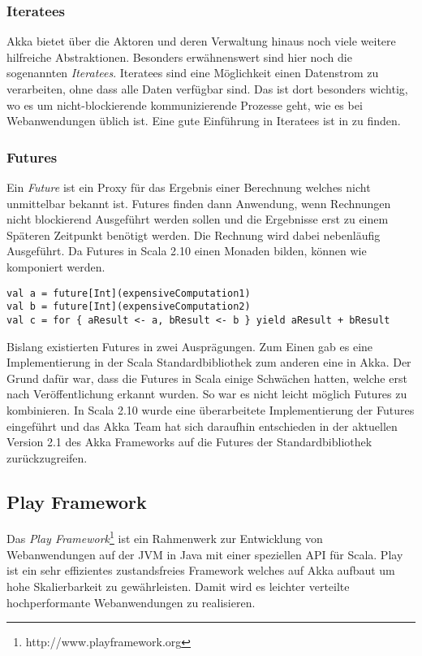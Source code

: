 \subsubsection{Iteratees}
\label{sec:iteratees}

Akka bietet über die Aktoren und deren Verwaltung hinaus noch viele weitere hilfreiche
Abstraktionen. Besonders erwähnenswert sind hier noch die sogenannten \textit{Iteratees}. Iteratees
sind eine Möglichkeit einen Datenstrom zu verarbeiten, ohne dass alle Daten verfügbar sind. Das ist
dort besonders wichtig, wo es um nicht-blockierende kommunizierende Prozesse geht, wie es bei
Webanwendungen üblich ist. Eine gute Einführung in Iteratees ist in \cite{iteratees} zu finden.

\subsubsection{Futures}
\label{sec:futures}

Ein \textit{Future} ist ein Proxy für das Ergebnis einer Berechnung welches nicht unmittelbar
bekannt ist. Futures finden dann Anwendung, wenn Rechnungen nicht blockierend Ausgeführt werden
sollen und die Ergebnisse erst zu einem Späteren Zeitpunkt benötigt werden. Die Rechnung wird dabei
nebenläufig Ausgeführt. Da Futures in Scala 2.10 einen Monaden bilden, können wie komponiert werden.

\begin{lstlisting}
val a = future[Int](expensiveComputation1)
val b = future[Int](expensiveComputation2)
val c = for { aResult <- a, bResult <- b } yield aResult + bResult
\end{lstlisting}

Bislang existierten Futures in zwei Ausprägungen. Zum Einen gab es eine Implementierung in der Scala
Standardbibliothek zum anderen eine in Akka. Der Grund dafür war, dass die Futures in Scala einige
Schwächen hatten, welche erst nach Veröffentlichung erkannt wurden. So war es nicht leicht möglich
Futures zu kombinieren. In Scala 2.10 wurde eine überarbeitete Implementierung der Futures
eingeführt und das Akka Team hat sich daraufhin entschieden in der aktuellen Version 2.1 des Akka
Frameworks auf die Futures der Standardbibliothek zurückzugreifen.

\subsection{Play Framework}

Das \textit{Play Framework}\footnote{http://www.playframework.org} ist ein Rahmenwerk zur
Entwicklung von Webanwendungen auf der JVM in Java mit einer speziellen API für Scala. Play ist ein
sehr effizientes zustandsfreies Framework welches auf Akka aufbaut um hohe Skalierbarkeit zu
gewährleisten. Damit wird es leichter verteilte hochperformante Webanwendungen zu realisieren.

